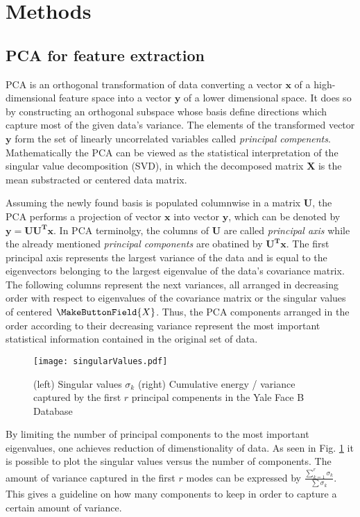 \section{Methods}
\subsection{PCA for feature extraction}

PCA is an orthogonal transformation of data converting a vector $\mathbf{x}$ of
a high-dimensional feature space into a vector $\mathbf{y}$ of a lower
dimensional space. It does so by constructing an orthogonal subspace whose basis
define directions which capture most of the given data's variance. The elements
of the transformed vector $\mathbf{y}$ form the set of linearly uncorrelated
variables called \textit{principal compenents}. Mathematically the PCA can be
viewed as the statistical interpretation of the singular value decomposition
(SVD), in which the decomposed matrix $\mathbf{X}$ is the mean substracted or
centered data matrix.

Assuming the newly found basis is populated columnwise in a matrix $\mathbf{U}$,
the PCA performs a projection of vector $\mathbf{x}$ into vector $\mathbf{y}$,
which can be denoted by $\mathbf{y = UU^Tx}$. In PCA terminolgy, the columns of
$\mathbf{U}$ are called \textit{principal axis} while the already mentioned
\textit{principal components} are obatined by $\mathbf{U^Tx}$. The first
principal axis represents the largest variance of the data and is equal to the
eigenvectors belonging to the largest eigenvalue of the data's covariance
matrix. The following columns represent the next variances, all arranged in
decreasing order with respect to eigenvalues of the covariance matrix or the
singular values of centered $\MakeButtonField{X}$. Thus, the PCA components
arranged in the order according to their decreasing variance represent the most
important statistical information contained in the original set of data. 

\begin{figure}[ht]  
  \centering
  \texttt{[image: singularValues.pdf]}
  \caption{(left) Singular values $\sigma_k$ (right) Cumulative energy /
  variance captured by the first $r$ principal compenents in the Yale Face B
  Database}
  \label{sv}
\end{figure}

By limiting the number of principal components to the most important
eigenvalues, one achieves reduction of dimenstionality of data. As seen in Fig.
\ref{sv} it is possible to plot the singular values versus the number of
components. The amount of variance captured in the first $r$ modes can be
expressed by $\frac{\sum\limits_{k=1}^{r}{\sigma_k}}{\sum{\sigma_k}}$. This
gives a guideline on how many components to keep in order to capture a certain
amount of variance.

